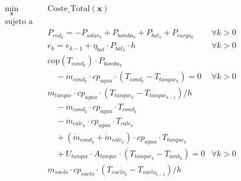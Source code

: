 \begin{align}
	\min_{\mathbf{x}} \quad & \text{Coste\_Total}(\mathbf{x})                                                                                                                \\
	\text{sujeto a} \quad   & \nonumber                                                                                                                                      \\
	                        & P_{red_k} = -P_{solar_k} + P_{bomba_k} + P_{bat_k} + P_{carga_k} \quad                                                         & \forall k > 0 \\
	                        & e_k = e_{k-1} + \eta_{bat} \cdot P_{bat_k} \cdot h \quad                                                                       & \forall k > 0 \\
	                        & \text{cop}(T_{cond_k}) \cdot P_{bomba_k} \nonumber                                                                                             \\
	                        & \quad - \dot{m}_{cond_k} \cdot cp_{agua} \cdot (T_{cond_k} - T_{tanque_k}) = 0 \label{eq:sys_1_sand}                           & \forall k > 0 \\
	                        & m_{tanque} \cdot cp_{agua} \cdot ( T_{tanque_k} - T_{tanque_{k-1}}) / h  \nonumber                                                             \\
	                        & \quad - \dot{m}_{cond_k} \cdot cp_{agua} \cdot T_{cond_k} \nonumber                                                                            \\
	                        & \quad - \dot{m}_{cale_k} \cdot cp_{agua} \cdot T_{cale_k} \nonumber                                                                            \\
	                        & \quad + (\dot{m}_{cond_k} + \dot{m}_{cale_k}) \cdot cp_{agua} \cdot T_{tanque_k} \nonumber                                                     \\
	                        & \quad + U_{tanque} \cdot A_{tanque} \cdot (T_{tanque_k} - T_{amb_k}) = 0 \label{eq:sys_2_sand}                                 & \forall k > 0 \\
	                        & m_{suelo} \cdot cp_{suelo} \cdot ( T_{suelo_k} - T_{suelo_{k-1}}) / h \nonumber                                                                \\

\end{align}

